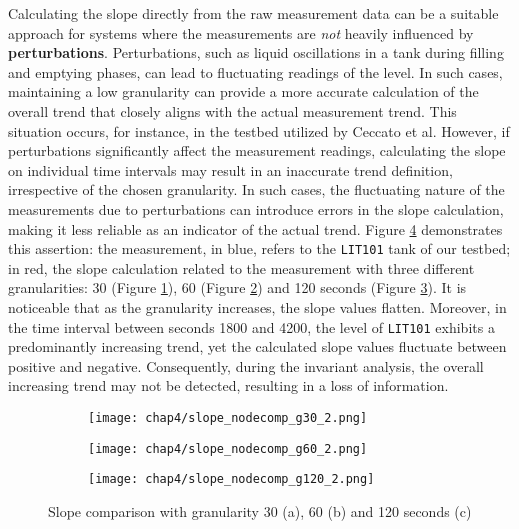 \bigskip
Calculating the slope directly from the raw measurement data can be a suitable approach for systems where the measurements are \textit{not} heavily influenced by \textbf{perturbations}. Perturbations, such as liquid oscillations in a tank during filling and emptying phases, can lead to fluctuating readings of the level. In such cases, maintaining a low granularity can provide a more accurate calculation of the overall trend that closely aligns with the actual measurement trend. This situation occurs, for instance, in the testbed utilized by Ceccato et al. \newline \newline 
However, if perturbations significantly affect the measurement readings, calculating the slope on individual time intervals may result in an inaccurate trend definition, irrespective of the chosen granularity. In such cases, the fluctuating nature of the measurements due to perturbations can introduce errors in the slope calculation, making it less reliable as an indicator of the actual trend.\newline \newline
Figure \ref{fig:4_slope_comparison} demonstrates this assertion: the measurement, in blue, refers to the \texttt{LIT101} tank of our testbed; in red, the slope calculation related to the measurement with three different granularities: 30 (Figure \ref{subfig:4_slope_g30_nodecomp}), 60 (Figure \ref{subfig:4_slope_g60_nodecomp}) and 120 seconds (Figure \ref{subfig:4_slope_g120_nodecomp}). It is noticeable that as the granularity increases, the slope values flatten. Moreover, in the time interval between seconds 1800 and 4200, the level of \texttt{LIT101} exhibits a predominantly increasing trend, yet the calculated slope values fluctuate between positive and negative. Consequently, during the invariant analysis, the overall increasing trend may not be detected, resulting in a loss of information.

\begin{figure}[H]
	\centering
	\begin{subfigure}{0.90\textwidth}
		\texttt{[image: chap4/slope\_nodecomp\_g30\_2.png]}
		\caption{}
		\label{subfig:4_slope_g30_nodecomp}
	\end{subfigure}
	\begin{subfigure}{0.90\textwidth}
		\texttt{[image: chap4/slope\_nodecomp\_g60\_2.png]}
		\caption{}
		\label{subfig:4_slope_g60_nodecomp}
	\end{subfigure}
	\begin{subfigure}{0.90\textwidth}
		\texttt{[image: chap4/slope\_nodecomp\_g120\_2.png]}
		\caption{}
		\label{subfig:4_slope_g120_nodecomp}
	\end{subfigure}
	\caption{Slope comparison with granularity 30 (a), 60 (b) and 120 seconds (c) }
	\label{fig:4_slope_comparison}
\end{figure}

